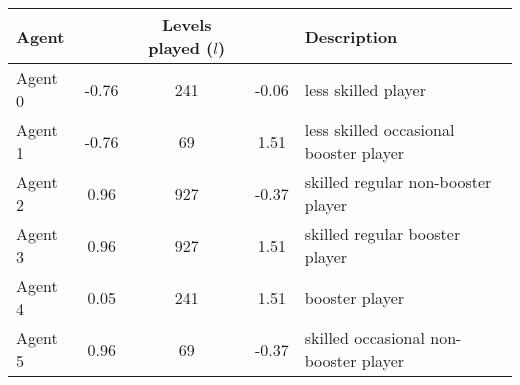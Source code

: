   \begin{tabular}{l S c S l }
    \toprule
    
    Agent &  &  Levels played ($l$) &  & Description \\

    \midrule
    Agent 0 & -0.76  & 241 & -0.06   & less skilled player \\ 
    Agent 1 & -0.76  & 69  & 1.51    & less skilled occasional booster player \\ 
    Agent 2 & 0.96   & 927 & -0.37   & skilled regular non-booster player \\ 
    Agent 3 & 0.96   & 927 & 1.51    & skilled regular booster player \\ 
    Agent 4 & 0.05   & 241 & 1.51    & booster player \\ 
    Agent 5 & 0.96   & 69  & -0.37   & skilled occasional non-booster player \\ 

    
    \bottomrule
    \end{tabular}